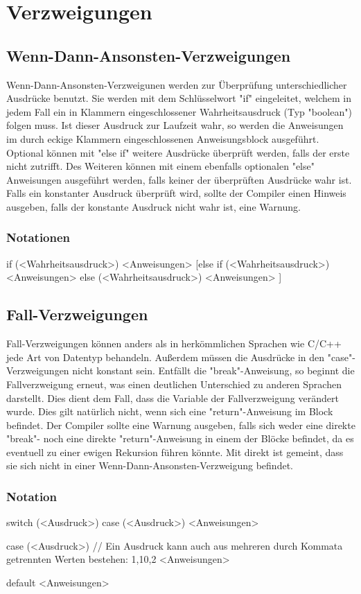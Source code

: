 \chapter{Verzweigungen}

\section{Wenn-Dann-Ansonsten-Verzweigungen}
Wenn-Dann-Ansonsten-Verzweigunen werden zur Überprüfung unterschiedlicher Ausdrücke benutzt.
Sie werden mit dem Schlüsselwort "if" eingeleitet, welchem in jedem Fall ein in Klammern eingeschlossener Wahrheitsausdruck (Typ "boolean")
folgen muss. Ist dieser Ausdruck zur Laufzeit wahr, so werden die Anweisungen im durch eckige Klammern eingeschlossenen Anweisungsblock
ausgeführt.
Optional können mit "else if" weitere Ausdrücke überprüft werden, falls der erste nicht zutrifft. Des Weiteren können mit einem ebenfalls optionalen
"else" Anweisungen ausgeführt werden, falls keiner der überprüften Ausdrücke wahr ist.
Falls ein konstanter Ausdruck überprüft wird, sollte der Compiler einen Hinweis ausgeben, falls der konstante Ausdruck nicht wahr ist, eine Warnung.

\subsection{Notationen}
if (<Wahrheitsausdruck>)
	<Anweisungen>
[else if (<Wahrheitsausdruck>)
	<Anweisungen>
else (<Wahrheitsausdruck>)
	<Anweisungen>
]

\section{Fall-Verzweigungen}
Fall-Verzweigungen können anders als in herkömmlichen Sprachen wie C/C++ jede Art von Datentyp behandeln. Außerdem müssen die Ausdrücke in den "case"-
Verzweigungen nicht konstant sein.
Entfällt die "break"-Anweisung, so beginnt die Fallverzweigung erneut, was einen deutlichen Unterschied zu anderen Sprachen darstellt.
Dies dient dem Fall, dass die Variable der Fallverzweigung verändert wurde.
Dies gilt natürlich nicht, wenn sich eine "return"-Anweisung im Block befindet.
Der Compiler sollte eine Warnung ausgeben, falls sich weder eine direkte "break"- noch eine direkte "return"-Anweisung in einem der Blöcke befindet, da
es eventuell zu einer ewigen Rekursion führen könnte.
Mit direkt ist gemeint, dass sie sich nicht in einer Wenn-Dann-Ansonsten-Verzweigung befindet.

\subsection{Notation}
switch (<Ausdruck>)
	case (<Ausdruck>)
		<Anweisungen>

	case (<Ausdruck>) // Ein Ausdruck kann auch aus mehreren durch Kommata getrennten Werten bestehen: 1,10,2
		<Anweisungen>

	default
		<Anweisungen>